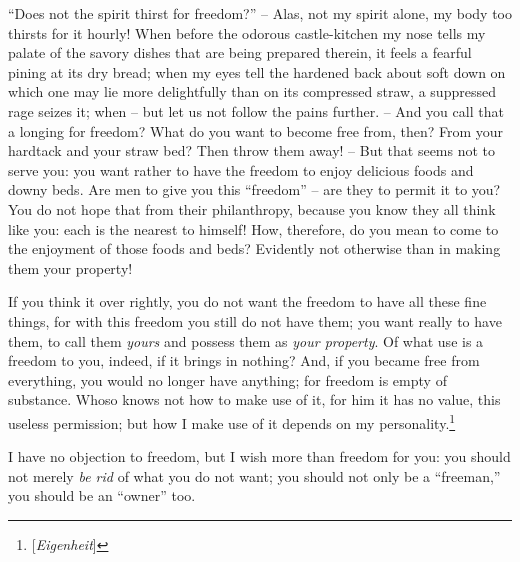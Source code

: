 \documentclass[12pt,a4paper]{book}
\begin{document}
``Does not the spirit thirst for freedom?'' -- Alas, not my spirit alone, my 
body too thirsts for it hourly! When before the odorous castle-kitchen my nose 
tells my palate of the savory dishes that are being prepared therein, it feels 
a fearful pining at its dry bread; when my eyes tell the hardened back about 
soft down on which one may lie more delightfully than on its compressed straw, 
a suppressed rage seizes it; when -- but let us not follow the pains further. 
-- And you call that a longing for freedom? What do you want to become free 
from, then? From your hardtack and your straw bed? Then throw them away! -- 
But that seems not to serve you: you want rather to have the freedom to enjoy 
delicious foods and downy beds. Are men to give you this ``freedom'' -- are 
they to permit it to you? You do not hope that from their philanthropy, 
because you know they all think like you: each is the nearest to himself! How, 
therefore, do you mean to come to the enjoyment of those foods and beds? 
Evidently not otherwise than in making them your property!

If you think it over rightly, you do not want the freedom to have all these 
fine things, for with this freedom you still do not have them; you want really 
to have them, to call them \textit{yours} and possess them as \textit{your 
property}. Of what use is a freedom to you, indeed, if it brings in nothing? 
And, if you became free from everything, you would no longer have anything; 
for freedom is empty of substance. Whoso knows not how to make use of it, for 
him it has no value, this useless permission; but how I make use of it depends 
on my personality.\footnote{[\textit{Eigenheit}]}

I have no objection to freedom, but I wish more than freedom for you: you 
should not merely \textit{be rid} of what you do not want; you should not only 
be a ``freeman,'' you should be an ``owner'' too.
\end{document}
